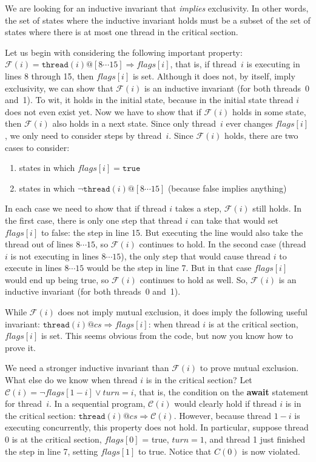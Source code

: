 \documentclass{report}
\begin{document}
We are looking for an inductive invariant that \emph{implies} exclusivity.
In other words, the set of states where the inductive invariant holds
must be a subset of the set of states where there is at most one thread in
the critical section.

Let us begin with considering the following important property:
$\mathcal{F}(i) = \mathtt{thread}(i)@[8 \cdots 15] \Rightarrow \mathit{flags}[i]$,
that is, if thread~$i$ is executing in lines 8 through 15, then $\mathit{flags}[i]$
is set.
Although it does not, by itself, imply exclusivity, we can show that
$\mathcal{F}(i)$ is an inductive invariant (for both threads~0 and~1).
To wit, it holds in the initial state, because in the initial state thread $i$ does
not even exist yet.
Now we have to show that if $\mathcal{F}(i)$ holds in some state, then
$\mathcal{F}(i)$ also holds in a next state.
Since only thread~$i$ ever changes $\mathit{flags}[i]$, we only need to
consider steps by thread~$i$.
Since $\mathcal{F}(i)$ holds, there are two cases to consider:
\begin{enumerate}
\item states in which $\mathit{flags}[i] = \texttt{true}$
\item states in which $\lnot \mathtt{thread}(i)@[8 \cdots 15]$
(because false implies anything)
\end{enumerate}
In each case we need to show that if thread $i$ takes a step, 
$\mathcal{F}(i)$ still holds.
In the first case, there is only one step that thread $i$ can take that would
set $\mathit{flags}[i]$ to false: the step in line 15.  But executing the line
would also take the thread out of lines $8 \cdots 15$, so $\mathcal{F}(i)$ continues to hold.
In the second case (thread $i$ is not executing in lines $8 \cdots 15$), the only step
that would cause thread $i$ to execute in lines $8 \cdots 15$ would be the step in line 7.
But in that case $\mathit{flags}[i]$ would end up being true, so
$\mathcal{F}(i)$ continues to hold as well.
So, $\mathcal{F}(i)$ is an inductive invariant (for both threads~0 and~1).

While $\mathcal{F}(i)$ does not imply mutual exclusion, it does imply the following useful
invariant: $\mathtt{thread}(i)@cs \Rightarrow \mathit{flags}[i]$: when thread $i$ is
at the critical section, $\mathit{flags}[i]$ is set.  This seems obvious from the code,
but now you know how to prove it.

We need a stronger inductive invariant than $\mathcal{F}(i)$ to prove mutual exclusion.
What else do we know when thread $i$ is in the critical section?
Let $\mathcal{C}(i) = \lnot\mathit{flags}[1 - i] \lor \mathit{turn} = i$, that is,
the condition on the \textbf{await} statement for thread~$i$.
In a sequential program, $\mathcal{C}(i)$ would clearly hold if thread $i$ is in
the critical section: $\mathtt{thread}(i)@cs \Rightarrow \mathcal{C}(i)$.
However, because thread $1-i$ is executing concurrently, this property does not
hold.  In particular, suppose thread 0 is at the critical section, $\mathit{flags}[0]$ = true,
$\mathit{turn} = 1$, and thread 1 just finished the step in line 7,
setting $\mathit{flags}[1]$ to true.  Notice that $C(0)$ is now violated.
\end{document}

